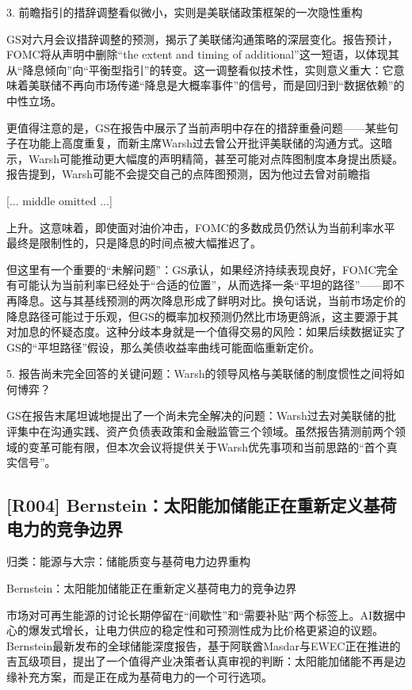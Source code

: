 \documentclass[11pt]{ctexart}
\begin{document}
3. 前瞻指引的措辞调整看似微小，实则是美联储政策框架的一次隐性重构

GS对六月会议措辞调整的预测，揭示了美联储沟通策略的深层变化。报告预计，FOMC将从声明中删除“the extent and timing of additional”这一短语，以体现其从“降息倾向”向“平衡型指引”的转变。这一调整看似技术性，实则意义重大：它意味着美联储不再向市场传递“降息是大概率事件”的信号，而是回归到“数据依赖”的中性立场。

更值得注意的是，GS在报告中展示了当前声明中存在的措辞重叠问题——某些句子在功能上高度重复，而新主席Warsh过去曾公开批评美联储的沟通方式。这暗示，Warsh可能推动更大幅度的声明精简，甚至可能对点阵图制度本身提出质疑。报告提到，Warsh可能不会提交自己的点阵图预测，因为他过去曾对前瞻指

[... middle omitted ...]

上升。这意味着，即使面对油价冲击，FOMC的多数成员仍然认为当前利率水平最终是限制性的，只是降息的时间点被大幅推迟了。

但这里有一个重要的“未解问题”：GS承认，如果经济持续表现良好，FOMC完全有可能认为当前利率已经处于“合适的位置”，从而选择一条“平坦的路径”——即不再降息。这与其基线预测的两次降息形成了鲜明对比。换句话说，当前市场定价的降息路径可能过于乐观，但GS的概率加权预测仍然比市场更鸽派，这主要源于其对加息的怀疑态度。这种分歧本身就是一个值得交易的风险：如果后续数据证实了GS的“平坦路径”假设，那么美债收益率曲线可能面临重新定价。

5. 报告尚未完全回答的关键问题：Warsh的领导风格与美联储的制度惯性之间将如何博弈？

GS在报告末尾坦诚地提出了一个尚未完全解决的问题：Warsh过去对美联储的批评集中在沟通实践、资产负债表政策和金融监管三个领域。虽然报告猜测前两个领域的变革可能有限，但本次会议将提供关于Warsh优先事项和当前思路的“首个真实信号”。

\subsection{[R004] Bernstein：太阳能加储能正在重新定义基荷电力的竞争边界}
{\small\color{refgray}归类：能源与大宗：储能质变与基荷电力边界重构}

Bernstein：太阳能加储能正在重新定义基荷电力的竞争边界

市场对可再生能源的讨论长期停留在“间歇性”和“需要补贴”两个标签上。AI数据中心的爆发式增长，让电力供应的稳定性和可预测性成为比价格更紧迫的议题。Bernstein最新发布的全球储能深度报告，基于阿联酋Masdar与EWEC正在推进的吉瓦级项目，提出了一个值得产业决策者认真审视的判断：太阳能加储能不再是边缘补充方案，而是正在成为基荷电力的一个可行选项。
\end{document}
